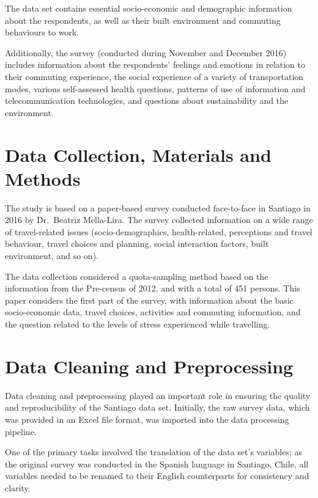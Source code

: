 \documentclass[
11pt, %
oneside, %
english, %
singlespacing, %
]{macthesis} %
\begin{document}
The data set contains essential socio-economic and demographic information about the respondents, as well as their built environment and commuting behaviours to work.

Additionally, the survey (conducted during November and December 2016) includes information about the respondents' feelings and emotions in relation to their commuting experience, the social experience of a variety of transportation modes, various self-assessed health questions, patterns of use of information and telecommunication technologies, and questions about sustainability and the environment.

\hypertarget{data-collection-materials-and-methods}{%
\section{Data Collection, Materials and Methods}\label{data-collection-materials-and-methods}}

The study is based on a paper-based survey conducted face-to-face in Santiago in 2016 by Dr.~Beatriz Mella-Lira. The survey collected information on a wide range of travel-related issues (socio-demographics, health-related, perceptions and travel behaviour, travel choices and planning, social interaction factors, built environment, and so on).

The data collection considered a quota-sampling method based on the information from the Pre-census of 2012, and with a total of 451 persons. This paper considers the first part of the survey, with information about the basic socio-economic data, travel choices, activities and commuting information, and the question related to the levels of stress experienced while travelling.

\hypertarget{data-cleaning-and-preprocessing}{%
\section{Data Cleaning and Preprocessing}\label{data-cleaning-and-preprocessing}}

Data cleaning and preprocessing played an important role in ensuring the quality and reproducibility of the Santiago data set. Initially, the raw survey data, which was provided in an Excel file format, was imported into the data processing pipeline.

One of the primary tasks involved the translation of the data set's variables; as the original survey was conducted in the Spanish language in Santiago, Chile, all variables needed to be renamed to their English counterparts for consistency and clarity.
\end{document}
